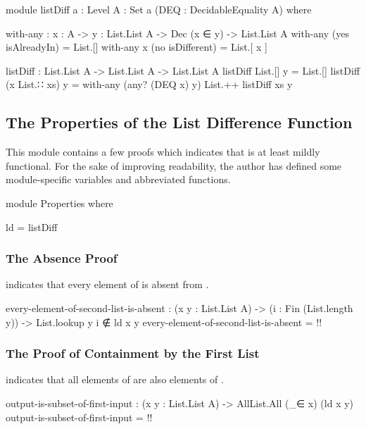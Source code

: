 \documentclass{report}
\begin{document}
\begin{code}
module listDiff
  {a : Level}
  {A : Set a}
  (DEQ : DecidableEquality A) where

  with-any : {x : A} ->
             {y : List.List A} ->
             Dec (x ∈ y) ->
             List.List A
  with-any (yes isAlreadyIn) = List.[]
  with-any {x} (no isDifferent) = List.[ x ]

  listDiff : List.List A -> List.List A -> List.List A
  listDiff List.[] y = List.[]
  listDiff (x List.∷ xs) y = with-any (any? (DEQ x) y) List.++ listDiff xs y
\end{code}

\subsection{The Properties of the List Difference Function}
This module contains a few proofs which indicates that  is at least mildly functional.  For the sake of improving readability, the author has defined some module-specific variables and abbreviated functions.

\begin{code}
  module Properties where

    ld = listDiff
\end{code}

\subsubsection{The Absence Proof}
   indicates that every element of  is absent from   .

\begin{code}
    every-element-of-second-list-is-absent :
      (x y : List.List A) ->
      (i : Fin (List.length y)) ->
      List.lookup y i ∉ ld x y
    every-element-of-second-list-is-absent = {!!}
\end{code}

\subsubsection{The Proof of Containment by the First List}
   indicates that all elements of    are also elements of .

\begin{code}
    output-is-subset-of-first-input :
      (x y : List.List A) ->
      AllList.All (_∈ x) (ld x y)
    output-is-subset-of-first-input = {!!}
\end{code}
\end{document}
